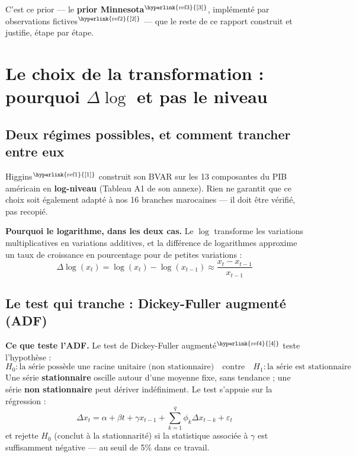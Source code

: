 \documentclass[11pt,a4paper]{article}
\newcommand{\cit}[1]{\textsuperscript{\hyperlink{ref#1}{[#1]}}}
\begin{document}
C'est ce prior --- le \textbf{prior Minnesota}$\cit{3}$, implémenté par observations fictives$\cit{2}$ --- que le reste de ce rapport construit et justifie, étape par étape.

\section{Le choix de la transformation : pourquoi $\Delta\log$ et pas le niveau}

\subsection{Deux régimes possibles, et comment trancher entre eux}

Higgins$\cit{1}$ construit son BVAR sur les 13 composantes du PIB américain en \textbf{log-niveau} (Tableau A1 de son annexe). Rien ne garantit que ce choix soit également adapté à nos 16 branches marocaines --- il doit être vérifié, pas recopié.

\begin{definitionbox}
\textbf{Pourquoi le logarithme, dans les deux cas.} Le $\log$ transforme les variations multiplicatives en variations additives, et la différence de logarithmes approxime un taux de croissance en pourcentage pour de petites variations :
\[
\Delta\log(x_t) = \log(x_t) - \log(x_{t-1}) \approx \frac{x_t - x_{t-1}}{x_{t-1}}
\]
\end{definitionbox}

\subsection{Le test qui tranche : Dickey-Fuller augmenté (ADF)}

\begin{definitionbox}
\textbf{Ce que teste l'ADF.} Le test de Dickey-Fuller augmenté$\cit{4}$ teste l'hypothèse :
\[
H_0 : \text{la série possède une racine unitaire (non stationnaire)} \quad \text{contre} \quad H_1 : \text{la série est stationnaire}
\]
Une série \textbf{stationnaire} oscille autour d'une moyenne fixe, sans tendance ; une série \textbf{non stationnaire} peut dériver indéfiniment. Le test s'appuie sur la régression :
\[
\Delta x_t = \alpha + \beta t + \gamma x_{t-1} + \sum_{k=1}^{q}\phi_k \Delta x_{t-k} + \varepsilon_t
\]
et rejette $H_0$ (conclut à la stationnarité) si la statistique associée à $\gamma$ est suffisamment négative --- au seuil de 5\% dans ce travail.
\end{definitionbox}
\end{document}
